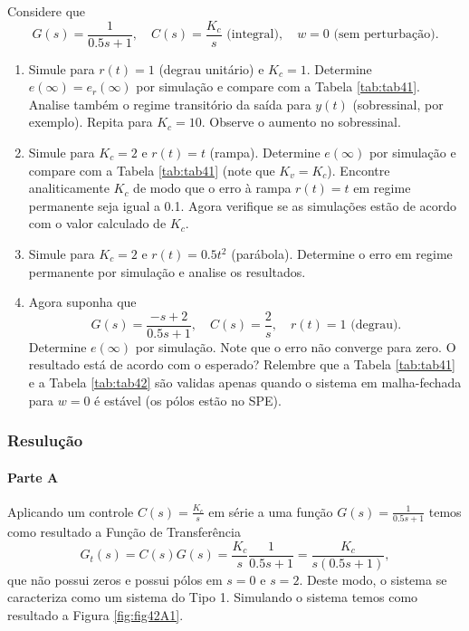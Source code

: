 \documentclass[
]{book}
\providecommand{\tightlist}{%
  \setlength{\itemsep}{0pt}\setlength{\parskip}{0pt}}
\begin{document}
Considere que
\[
G(s) = \frac {1}{0.5s+1}, \quad C(s) = \frac{K_c}{s} \text{ (integral)}, \quad w=0 \text{ (sem perturbação).}
\]

\begin{enumerate}
\def\labelenumi{\alph{enumi}.}
\tightlist
\item
  Simule para \(r(t) = 1\) (degrau unitário) e \(K_c = 1\). Determine \(e(\infty) = e_r(\infty)\) por simulação e compare com a Tabela \ref{tab:tab41}. Analise também o regime transitório da saída para \(y(t)\) (sobressinal, por exemplo). Repita para \(K_c = 10\). Observe o aumento no sobressinal.
\item
  Simule para \(K_c = 2\) e \(r(t) = t\) (rampa). Determine \(e(\infty)\) por simulação e compare com a Tabela \ref{tab:tab41} (note que \(K_v = K_c\)). Encontre analiticamente \(K_c\) de modo que o erro à rampa \(r(t) = t\) em regime permanente seja igual a 0.1. Agora verifique se as simulações estão de acordo com o valor calculado de \(K_c\).
\item
  Simule para \(K_c = 2\) e \(r(t) = 0.5t^2\) (parábola). Determine o erro em regime permanente por simulação e analise os resultados.
\item
  Agora suponha que
  \[
  G(s) = \frac {-s+2}{0.5s+1}, \quad C(s)= \frac{2}{s}, \quad r(t) = 1 \text{ (degrau).}
  \]
  Determine \(e(\infty)\) por simulação. Note que o erro não converge para zero. O resultado está de acordo com o esperado? Relembre que a Tabela \ref{tab:tab41} e a Tabela \ref{tab:tab42} são validas apenas quando o sistema em malha-fechada para \(w=0\) é estável (os pólos estão no SPE).
\end{enumerate}

\hypertarget{resuluuxe7uxe3o}{%
\subsubsection*{Resulução}\label{resuluuxe7uxe3o}}

\hypertarget{parte-a-1}{%
\paragraph*{Parte A}\label{parte-a-1}}

Aplicando um controle \(C(s) = \frac {K_c}{s}\) em série a uma função \(G(s) = \frac {1}{0.5s+1}\) temos como resultado a Função de Transferência\\
\[
G_t(s) = C(s)G(s) = \frac {K_c}{s} \frac{1}{0.5s+1} = \frac {K_c}{s(0.5s+1)},
\]
que não possui zeros e possui pólos em \(s = 0\) e \(s = 2\). Deste modo, o sistema se caracteriza como um sistema do Tipo 1. Simulando o sistema temos como resultado a Figura \ref{fig:fig42A1}.
\end{document}
